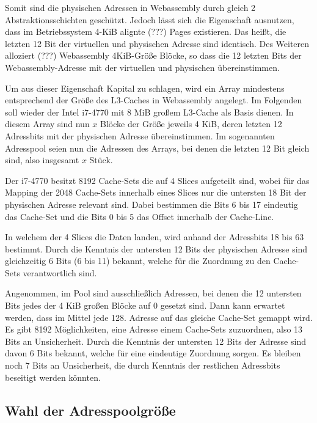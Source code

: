 Somit sind die physischen Adressen in Webassembly durch gleich 2 Abstraktionsschichten geschützt. 
Jedoch lässt sich die Eigenschaft ausnutzen, dass im Betriebssystem 4-KiB alignte (???) Pages existieren. 
Das heißt, die letzten 12 Bit der virtuellen und physischen Adresse sind identisch. 
Des Weiteren alloziert (???) Webassembly 4KiB-Größe Blöcke, so dass die 12 letzten Bits der Webassembly-Adresse mit der virtuellen und physischen übereinstimmen.

Um aus dieser Eigenschaft Kapital zu schlagen, wird ein Array mindestens entsprechend der Größe des L3-Caches in Webassembly angelegt. Im Folgenden soll wieder der Intel i7-4770 mit 8 MiB großem L3-Cache als Basis dienen. In diesem Array sind nun $x$ Blöcke der Größe jeweils 4 KiB, deren letzten 12 Adressbits mit der physischen Adresse übereinstimmen. Im sogenannten Adresspool seien nun die Adressen des Arrays, bei denen die letzten 12 Bit gleich sind, also insgesamt $x$ Stück.

Der i7-4770 besitzt 8192 Cache-Sets die auf 4 Slices aufgeteilt sind, wobei für das Mapping der 2048 Cache-Sets innerhalb eines Slices nur die untersten 18 Bit der physischen Adresse relevant sind. Dabei bestimmen die Bits 6 bis 17 eindeutig das Cache-Set und die Bits 0 bis 5 das Offset innerhalb der Cache-Line.

In welchem der 4 Slices die Daten landen, wird anhand der Adressbits 18 bis 63 bestimmt.
Durch die Kenntnis der untersten 12 Bits der physischen Adresse sind gleichzeitig 6 Bits (6 bis 11) bekannt, welche für die Zuordnung zu den Cache-Sets verantwortlich sind.

Angenommen, im Pool sind ausschließlich Adressen, bei denen die 12 untersten Bits jedes der 4 KiB großen Blöcke auf 0 gesetzt sind. Dann kann erwartet werden, dass im Mittel jede 128. 
Adresse auf das gleiche Cache-Set gemappt wird. Es gibt 8192 Möglichkeiten, eine Adresse einem Cache-Sets zuzuordnen, also 13 Bits an Unsicherheit.
Durch die Kenntnis der untersten 12 Bits der Adresse sind davon 6 Bits bekannt, welche für eine eindeutige Zuordnung sorgen. 
Es bleiben noch 7 Bits an Unsicherheit, die durch Kenntnis der restlichen Adressbits beseitigt werden könnten.

\subsection{Wahl der Adresspoolgröße}

